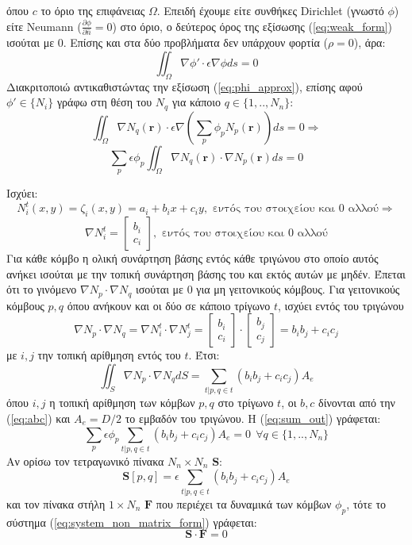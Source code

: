 \documentclass[10pt, letterpaper]{article}
\newcommand{\en}{\selectlanguage{english}}
\newcommand{\gr}{\selectlanguage{greek}}
\begin{document}
όπου $c$ το όριο της επιφάνειας $\Omega$. Επειδή έχουμε είτε συνθήκες \en Dirichlet \gr (γνωστό $\phi$)  είτε \en Neumann \gr 
($\frac{\partial \phi}{\partial \hat{n}} = 0$) στο όριο, ο δεύτερος όρος της εξίσωσης (\ref{eq:weak_form}) ισούται με 0. Επίσης και στα δύο προβλήματα 
δεν υπάρχουν φορτία ($\rho = 0$), άρα:
\[ \iint_{\Omega} \nabla \phi' \cdot \epsilon \nabla \phi ds = 0\]
Διακριτοποιώ αντικαθιστώντας την εξίσωση (\ref{eq:phi_approx}), επίσης αφού $\phi' \in \{N_i\}$ γράφω στη θέση του $N_q$ για κάποιο $q \in \{1,..,N_n\}$:
\[ \iint_{\Omega} \nabla N_q(\mathbf{r}) \cdot \epsilon \nabla (\sum_p \phi_p N_p(\mathbf{r}))  ds = 0 \Rightarrow\]
\begin{equation} \label{eq:sum_out}
  \sum_p \epsilon \phi_p \iint_{\Omega} \nabla N_q(\mathbf{r}) \cdot \nabla N_p(\mathbf{r})ds = 0
\end{equation}

Ισχύει:
\[ N_i^t (x,y) =  \zeta_i(x,y) = a_i + b_ix + c_iy, \text{\ εντός του στοιχείου και $0$ αλλού}\Rightarrow\]
\[ \nabla N_i^t =   
    \begin{bmatrix}
        b_i \\
        c_i
    \end{bmatrix}
                    , \text{\ εντός του στοιχείου και $0$ αλλού}\]
Για κάθε κόμβο η ολική συνάρτηση βάσης εντός κάθε τριγώνου στο οποίο αυτός ανήκει ισούται με 
την τοπική συνάρτηση βάσης του και εκτός αυτών με μηδέν.
Έπεται ότι το γινόμενο $\nabla N_p \cdot \nabla N_q$ ισούται με $0$ για μη γειτονικούς κόμβους. Για γειτονικούς κόμβους $p,q$ όπου 
ανήκουν και οι δύο σε κάποιο 
τρίγωνο $t$, ισχύει εντός του τριγώνου
\[ \nabla N_p  \cdot \nabla N_q  = \nabla N_i^t \cdot \nabla N_j^t = 
    \begin{bmatrix}
        b_i \\
        c_i
    \end{bmatrix}
      \cdot 
    \begin{bmatrix}
        b_j \\
        c_j        
    \end{bmatrix}
    =  b_ib_j + c_ic_j
\]
με $i,j$ την τοπική αρίθμηση εντός του $t$. Έτσι:
\begin{equation} \label{eq:int_of_grad_Np_Nq_}
  \iint_S \nabla N_p  \cdot \nabla N_q  dS = \sum_{t | p,q \in t} (b_ib_j + c_ic_j) A_e 
\end{equation}
όπου $i,j$ η τοπική αρίθμηση των κόμβων $p,q$ στο τρίγωνο $t$, οι $b,c$ δίνονται από την (\ref{eq:abc}) και $A_e = D/2$ το εμβαδόν του τριγώνου.
Η (\ref{eq:sum_out}) γράφεται:
\begin{equation}  \label{eq:system_non_matrix_form}
  \sum_p \epsilon \phi_p \sum_{t | p,q \in t} (b_ib_j + c_ic_j) A_e  = 0   \ \ \forall q \in \{1,..,N_n\}
\end{equation}
Αν ορίσω τον τετραγωνικό πίνακα $N_n \times N_n$ $\mathbf{S}$:
\[ \mathbf{S}[p,q] = \epsilon \sum_{t | p,q \in t} (b_ib_j + c_ic_j) A_e  \]
και τον πίνακα στήλη $1 \times N_n$ $\mathbf{F}$ που περιέχει τα δυναμικά των κόμβων $\phi_p$, τότε το σύστημα (\ref{eq:system_non_matrix_form}) γράφεται:
\[ \mathbf{S} \cdot \mathbf{F} = 0 \]
\end{document}
